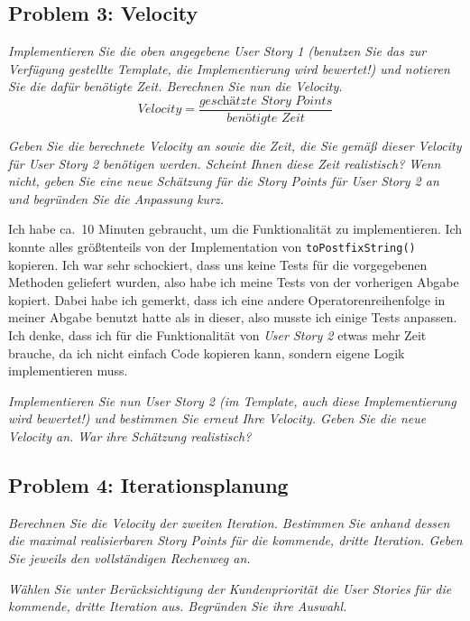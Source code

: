 \documentclass[
  ngerman,
  DIV=14
]{scrartcl}
\begin{document}
\subsection*{Problem 3: Velocity}
\emph{Implementieren Sie die oben angegebene User Story 1 (benutzen Sie das zur Verfügung gestellte Template, die Implementierung wird bewertet!) und notieren Sie die dafür benötigte Zeit. Berechnen Sie nun die Velocity.}
\begin{equation*}
\textit{Velocity} = \frac{\textit{geschätzte Story Points}}{\textit{benötigte Zeit}}  
\end{equation*}

\medskip\noindent
\emph{Geben Sie die berechnete Velocity an sowie die Zeit, die Sie gemäß dieser Velocity für User Story 2 benötigen werden. Scheint Ihnen diese Zeit realistisch? Wenn nicht, geben Sie eine neue Schätzung für die Story Points für User Story 2 an und begründen Sie die Anpassung kurz.}

\medskip\noindent
Ich habe ca.\ 10 Minuten gebraucht, um die Funktionalität zu implementieren. Ich konnte alles größtenteils von der Implementation von \texttt{toPostfixString()} kopieren. Ich war sehr schockiert, dass uns keine Tests für die vorgegebenen Methoden geliefert wurden, also habe ich meine Tests von der vorherigen Abgabe kopiert. Dabei habe ich gemerkt, dass ich eine andere Operatorenreihenfolge in meiner Abgabe benutzt hatte als in dieser, also musste ich einige Tests anpassen. Ich denke, dass ich für die Funktionalität von \emph{User Story 2} etwas mehr Zeit brauche, da ich nicht einfach Code kopieren kann, sondern eigene Logik implementieren muss. 

\medskip\noindent
\emph{Implementieren Sie nun User Story 2 (im Template, auch diese Implementierung wird bewertet!) und bestimmen Sie erneut Ihre Velocity. Geben Sie die neue Velocity an. War ihre Schätzung realistisch?}

\subsection*{Problem 4: Iterationsplanung}
\emph{Berechnen Sie die Velocity der zweiten Iteration.
Bestimmen Sie anhand dessen die maximal realisierbaren Story Points für die kommende, dritte Iteration. Geben Sie jeweils den vollständigen Rechenweg an.}

\medskip\noindent
\emph{Wählen Sie unter Berücksichtigung der Kundenpriorität die User Stories für die kommende, dritte Iteration aus. Begründen Sie ihre Auswahl.}
\end{document}
